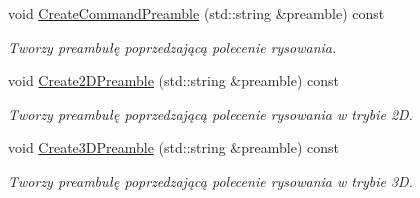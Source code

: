 \begin{DoxyCompactItemize}
$$\item 
void \hyperlink{class_pz_g_1_1_gnuplot_link_aa2555a85839c555480c18da5015c0b26}{Create\+Command\+Preamble} (std\+::string \&preamble) const
\begin{DoxyCompactList}\small\item\em Tworzy preambułę poprzedzającą polecenie rysowania. \end{DoxyCompactList}\item 
void \hyperlink{class_pz_g_1_1_gnuplot_link_a562fc970535935237a32f18faf4f0b19}{Create2\+D\+Preamble} (std\+::string \&preamble) const
\begin{DoxyCompactList}\small\item\em Tworzy preambułę poprzedzającą polecenie rysowania w trybie 2D. \end{DoxyCompactList}\item 
void \hyperlink{class_pz_g_1_1_gnuplot_link_a475373e9f4e3ea655a64e7daabd56ac9}{Create3\+D\+Preamble} (std\+::string \&preamble) const
\begin{DoxyCompactList}\small\item\em Tworzy preambułę poprzedzającą polecenie rysowania w trybie 3D. \end{DoxyCompactList}\end{DoxyCompactItemize}
